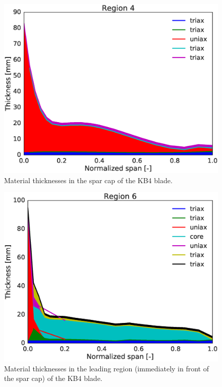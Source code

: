 \begin{figure}[!ht]
\begin{center}
	\includegraphics[width=.85\linewidth]{figures/KB4_laminate_layers_r04.eps}
\end{center}
\caption{Material thicknesses in the spar cap of the KB4 blade.}
\label{fig:KB4matstackr04}
\end{figure}

\begin{figure}[!ht]
\begin{center}
	\includegraphics[width=.85\linewidth]{figures/KB4_laminate_layers_r06.eps}
\end{center}
\caption{Material thicknesses in the leading region (immediately in front of the spar cap) of the KB4 blade.}
\label{fig:KB4matstackr06}
\end{figure}

